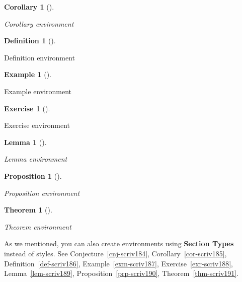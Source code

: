 \documentclass[
  12pt,
  a4paper,
  oneside,
  titlepage,
  toclink=all,
  toc=bibliography]{scrbook}
\theoremstyle{plain}
\newtheorem{lemma}{Lemma}[section]
\theoremstyle{definition}
\newtheorem{example}{Example}[section]
\theoremstyle{definition}
\newtheorem{exercise}{Exercise}[section]
\theoremstyle{plain}
\newtheorem{theorem}{Theorem}[section]
\theoremstyle{plain}
\theoremstyle{plain}
\newtheorem{proposition}{Proposition}[section]
\theoremstyle{definition}
\newtheorem{definition}{Definition}[section]
\theoremstyle{plain}
\newtheorem{corollary}{Corollary}[section]
\theoremstyle{remark}
\begin{document}
\begin{corollary}[]\protect\hypertarget{cor-scriv183}{}\label{cor-scriv183}

Corollary environment

\end{corollary}

\begin{definition}[]\protect\hypertarget{def-scriv183}{}\label{def-scriv183}

Definition environment

\end{definition}

\begin{example}[]\protect\hypertarget{exm-scriv183}{}\label{exm-scriv183}

Example environment

\end{example}

\begin{exercise}[]\protect\hypertarget{exr-scriv183}{}\label{exr-scriv183}

Exercise environment

\end{exercise}

\begin{lemma}[]\protect\hypertarget{lem-scriv183}{}\label{lem-scriv183}

Lemma environment

\end{lemma}

\begin{proposition}[]\protect\hypertarget{prp-scriv183}{}\label{prp-scriv183}

Proposition environment

\end{proposition}

\begin{theorem}[]\protect\hypertarget{thm-scriv183}{}\label{thm-scriv183}

Theorem environment

\end{theorem}

As we mentioned, you can also create environments using \textbf{Section
Types} instead of styles. See
\protect\hypertarget{cite_47}{}{\label{cite_47}Conjecture~\ref{cnj-scriv184}},
\protect\hypertarget{cite_48}{}{\label{cite_48}Corollary~\ref{cor-scriv185}},
\protect\hypertarget{cite_49}{}{\label{cite_49}Definition~\ref{def-scriv186}},
\protect\hypertarget{cite_50}{}{\label{cite_50}Example~\ref{exm-scriv187}},
\protect\hypertarget{cite_51}{}{\label{cite_51}Exercise~\ref{exr-scriv188}},
\protect\hypertarget{cite_52}{}{\label{cite_52}Lemma~\ref{lem-scriv189}},
\protect\hypertarget{cite_53}{}{\label{cite_53}Proposition~\ref{prp-scriv190}},
\protect\hypertarget{cite_54}{}{\label{cite_54}Theorem~\ref{thm-scriv191}}.
\end{document}
